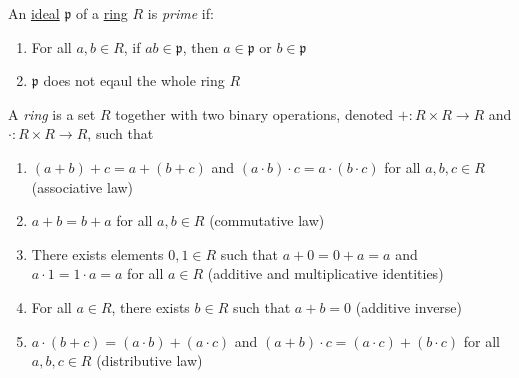 \begin{definition} \label{primeideal}%
  An \hyperref[ideal]{ideal} $\mathfrak{p}$ of a \hyperref[ring]{ring} $R$ is \emph{prime} if:
  \begin{enumerate}
    \item For all $a,b \in R$, if $ab \in \mathfrak{p}$, then $a \in \mathfrak{p}$ or $b \in \mathfrak{p}$
    \item $\mathfrak{p}$ does not eqaul the whole ring $R$
  \end{enumerate}
\end{definition}

\begin{definition} \label{ring} %
  A \emph{ring} is a set $R$ together with two binary operations, denoted $+: R \times R \longrightarrow R$ and $\cdot: R \times R \longrightarrow R$, such that
  \begin{enumerate}
    \item $(a+b)+c = a+(b+c)$ and $(a \cdot b) \cdot c = a \cdot (b \cdot c)$ for all $a,b,c \in R$ (associative law)
    \item $a+b = b+a$ for all $a,b \in R$ (commutative law)
    \item There exists elements $0,1 \in R$ such that $a+0 = 0 + a = a $ and $a\cdot1 = 1 \cdot a = a $ for all $a \in R$ (additive and multiplicative identities)
    \item For all $a \in R$, there exists $b \in R$ such that $a+b = 0$ (additive inverse)
    \item $a\cdot(b+c) = (a \cdot b) + (a \cdot c)$ and $(a+b) \cdot c = (a \cdot c) + (b \cdot c)$ for all $a,b,c \in R$ (distributive law)
  \end{enumerate}
\end{definition}